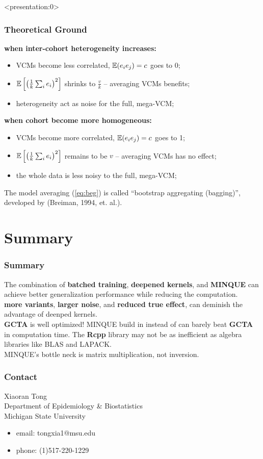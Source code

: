 \documentclass{beamer}
\begin{document}
\begin{frame} <presentation:0>%
  \frametitle{Theoretical Ground}%
  \textbf{when inter-cohort heterogeneity increases:}
  \begin{itemize}
  \item VCMs become less correlated, $\mathbb{E}(e_i e_j) = c$ goes to 0;
  \item $\mathbb{E}\left[ \left(\frac{1}{k}\sum_i e_i\right)^2 \right]$
    shrinks to $\frac{v}{k}$ -- averaging VCMs benefits;
  \item heterogeneity act as noise for the full, mega-VCM;
  \end{itemize}
  \textbf{when cohort become more homogeneous:}
  \begin{itemize}
  \item VCMs become more correlated, $\mathbb{E}(e_i e_j) = c$ goes to 1;
  \item $\mathbb{E}\left[ \left(\frac{1}{k}\sum_i e_i\right)^2 \right]$
    remains to be $v$ -- averaging VCMs has no effect;
  \item the whole data is less noisy to the full, mega-VCM;
  \end{itemize}
  The model averaging (\ref{eq:beg}) is called ``bootstrap aggregating
  (bagging)'', developed by (Breiman, 1994, et. al.).
\end{frame}
\section{Summary}
\begin{frame} %
  \frametitle{Summary} %
  The combination of \textbf{batched training}, \textbf{deepened
    kernels}, and \textbf{MINQUE} can achieve better generalization
  performance while
  reducing the computation. \\
  \textbf{more variants}, \textbf{larger noise}, and \textbf{reduced
    true effect}, can deminish the advantage of deenped kernels. \\
  \textbf{GCTA} is well optimized! MINQUE build in\textbf{}
  instead of \textbf{} can barely beat \textbf{GCTA} in
  computation time. The \textbf{Rcpp} library may not  be as inefficient
  as algebra libraries like BLAS and LAPACK. \\
  MINQUE's bottle neck is matrix multiplication, not inversion.
\end{frame}
\begin{frame} %
  \frametitle{Contact} %
  Xiaoran Tong \\
  Department of Epidemiology \& Biostatistics \\
  Michigan State University
  \begin{itemize}
  \item email: tongxia1@msu.edu
  \item phone: (1)517-220-1229
  \end{itemize}
\end{frame}
\end{document}
